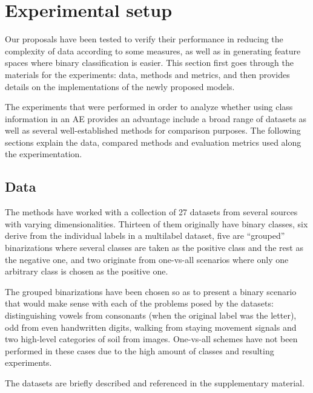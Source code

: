 \documentclass[
	fontsize=11pt, %
	twoside=false, %
	open=any, %
	secnumdepth=1, %
]{kaobook}
\newcommand{\change}[1]{{\color{blue}#1}}
\renewcommand{\change}[1]{#1}
\newcommand{\rechange}[1]{{\color{blue}#1}}
\renewcommand{\rechange}[1]{#1}
\begin{document}
\section{Experimental setup}\label{sec.setup}

Our proposals have been tested to verify their performance in reducing the complexity of data according to some measures, as well as in generating feature spaces where \rechange{binary} classification is easier. This section first goes through the materials for the experiments: data, methods and metrics, and then provides details on the implementations of the newly proposed models.

The experiments that were performed in order to analyze whether using class information in an AE provides an advantage include a broad range of datasets as well as several well-established methods for comparison purposes. The following sections explain the data, compared methods and evaluation metrics used along the experimentation.

\subsection{Data}

The methods have worked with a collection of 27 datasets from several sources with varying dimensionalities.
\change{Thirteen of them originally have binary classes, six derive from the individual labels in a multilabel dataset, five are ``grouped'' binarizations where several classes are taken as the positive class and the rest as the negative one, and two originate from one-vs-all scenarios where only one arbitrary class is chosen as the positive one.}

\change{The grouped binarizations have been chosen so as to present a binary scenario that would make sense with each of the problems posed by the datasets: distinguishing vowels from consonants (when the original label was the letter), odd from even handwritten digits, walking from staying movement signals and two high-level categories of soil from images. One-vs-all schemes have not been performed in these cases due to the high amount of classes and resulting experiments.}

The datasets are briefly described and referenced \change{in the supplementary material.}
\end{document}
